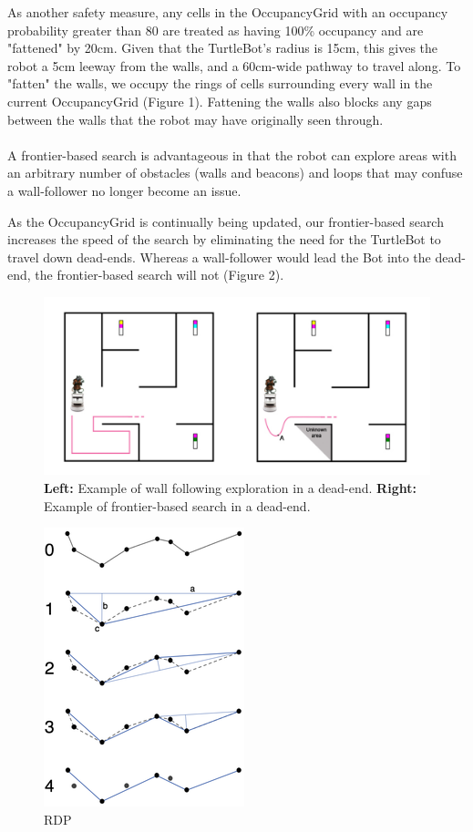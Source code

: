 \documentclass[titlepage,12pt,a4paper]{article}
\begin{document}
\noindent
As another safety measure, any cells in the OccupancyGrid with an occupancy probability greater than 80 are treated as having 100\% occupancy and are "fattened" by 20cm. Given that the TurtleBot's radius is 15cm, this gives the robot a 5cm leeway from the walls, and a 60cm-wide pathway to travel along. To "fatten" the walls, we occupy the rings of cells surrounding every wall in the current OccupancyGrid (Figure 1). Fattening the walls also blocks any gaps between the walls that the robot may have originally seen through. \\
\\
A frontier-based search is advantageous in that the robot can explore areas with an arbitrary number of obstacles (walls and beacons) and loops that may confuse a wall-follower no longer become an issue. \\

\pagebreak


\noindent
As the OccupancyGrid is continually being updated, our frontier-based search increases the speed of the search by eliminating the need for the TurtleBot to travel down dead-ends. Whereas a wall-follower would lead the Bot into the dead-end, the frontier-based search will not (Figure 2).\\

\begin{figure}[h]
	\centering
	\includegraphics[scale=0.2]{paths.jpg}
	\caption{\textbf{Left:} Example of wall following exploration in a dead-end. \textbf{Right:} Example of frontier-based search in a dead-end.}
\end{figure}

\begin{figure}
	\includegraphics[scale=0.5]{rdp.png}
	\caption{RDP}
\end{figure}
\end{document}
